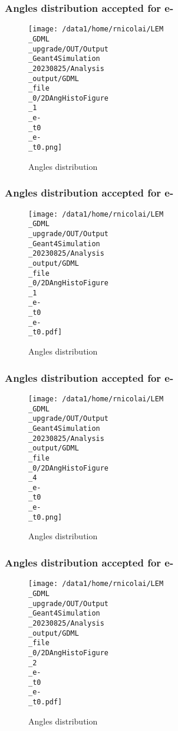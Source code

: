 \documentclass[8pt]{beamer}
\begin{document}
            \begin{frame}
                \frametitle{Angles distribution accepted for e-}
            
        \begin{figure}[h]
            \centering
            \texttt{[image: /data1/home/rnicolai/LEM\\\_GDML\\\_upgrade/OUT/Output\\\_Geant4Simulation\\\_20230825/Analysis\\\_output/GDML\\\_file\\\_0/2DAngHistoFigure\\\_1\\\_e-\\\_t0\\\_e-\\\_t0.png]}
            \caption{Angles distribution}
        \end{figure}
        
            \end{frame}
            
            \begin{frame}
                \frametitle{Angles distribution accepted for e-}
            
        \begin{figure}[h]
            \centering
            \texttt{[image: /data1/home/rnicolai/LEM\\\_GDML\\\_upgrade/OUT/Output\\\_Geant4Simulation\\\_20230825/Analysis\\\_output/GDML\\\_file\\\_0/2DAngHistoFigure\\\_1\\\_e-\\\_t0\\\_e-\\\_t0.pdf]}
            \caption{Angles distribution}
        \end{figure}
        
            \end{frame}
            
            \begin{frame}
                \frametitle{Angles distribution accepted for e-}
            
        \begin{figure}[h]
            \centering
            \texttt{[image: /data1/home/rnicolai/LEM\\\_GDML\\\_upgrade/OUT/Output\\\_Geant4Simulation\\\_20230825/Analysis\\\_output/GDML\\\_file\\\_0/2DAngHistoFigure\\\_4\\\_e-\\\_t0\\\_e-\\\_t0.png]}
            \caption{Angles distribution}
        \end{figure}
        
            \end{frame}
            
            \begin{frame}
                \frametitle{Angles distribution accepted for e-}
            
        \begin{figure}[h]
            \centering
            \texttt{[image: /data1/home/rnicolai/LEM\\\_GDML\\\_upgrade/OUT/Output\\\_Geant4Simulation\\\_20230825/Analysis\\\_output/GDML\\\_file\\\_0/2DAngHistoFigure\\\_2\\\_e-\\\_t0\\\_e-\\\_t0.pdf]}
            \caption{Angles distribution}
        \end{figure}
        
            \end{frame}
            
\end{document}
